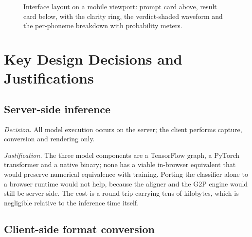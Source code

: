 \begin{figure}[H]
\caption[User interface design]{Interface layout on a mobile viewport: prompt
card above, result card below, with the clarity ring, the verdict-shaded
waveform and the per-phoneme breakdown with probability meters.}
\label{fig:ui}
\end{figure}

\section{Key Design Decisions and Justifications}
\label{sec:design-decisions}

\subsection{Server-side inference}

\emph{Decision.} All model execution occurs on the server; the client performs
capture, conversion and rendering only.

\emph{Justification.} The three model components are a TensorFlow graph, a
PyTorch transformer and a native binary; none has a viable in-browser
equivalent that would preserve numerical equivalence with training. Porting the
classifier alone to a browser runtime would not help, because the aligner and
the G2P engine would still be server-side. The cost is a round trip carrying
tens of kilobytes, which is negligible relative to the inference time itself.

\subsection{Client-side format conversion}

